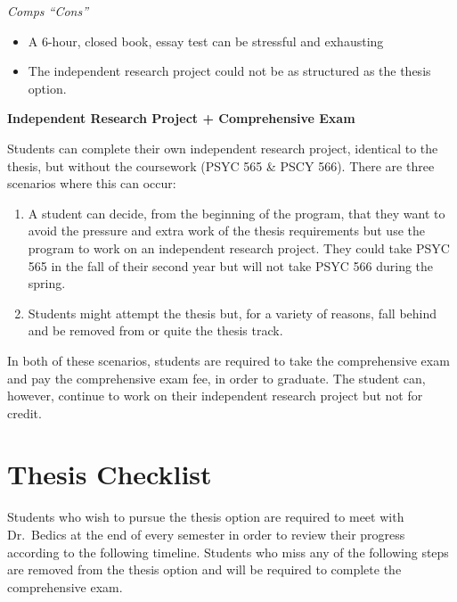 \documentclass[openany]{book}
\providecommand{\tightlist}{%
  \setlength{\itemsep}{0pt}\setlength{\parskip}{0pt}}
\begin{document}
\emph{Comps ``Cons''}

\begin{itemize}
\tightlist
\item
  A 6-hour, closed book, essay test can be stressful and exhausting
\item
  The independent research project could not be as structured as the thesis option.
\end{itemize}

\textbf{Independent Research Project + Comprehensive Exam}

Students can complete their own independent research project, identical to the thesis, but without the coursework (PSYC 565 \& PSCY 566). There are three scenarios where this can occur:

\begin{enumerate}
\def\labelenumi{\arabic{enumi}.}
\tightlist
\item
  A student can decide, from the beginning of the program, that they want to avoid the pressure and extra work of the thesis requirements but use the program to work on an independent research project. They could take PSYC 565 in the fall of their second year but will not take PSYC 566 during the spring.
\item
  Students might attempt the thesis but, for a variety of reasons, fall behind and be removed from or quite the thesis track.
\end{enumerate}

In both of these scenarios, students are required to take the comprehensive exam and pay the comprehensive exam fee, in order to graduate. The student can, however, continue to work on their independent research project but not for credit.

\hypertarget{thesis-checklist}{%
\chapter{Thesis Checklist}\label{thesis-checklist}}

Students who wish to pursue the thesis option are required to meet with Dr.~Bedics at the end of every semester in order to review their progress according to the following timeline.
Students who miss any of the following steps are removed from the thesis option and will be required to complete the comprehensive exam.
\end{document}
